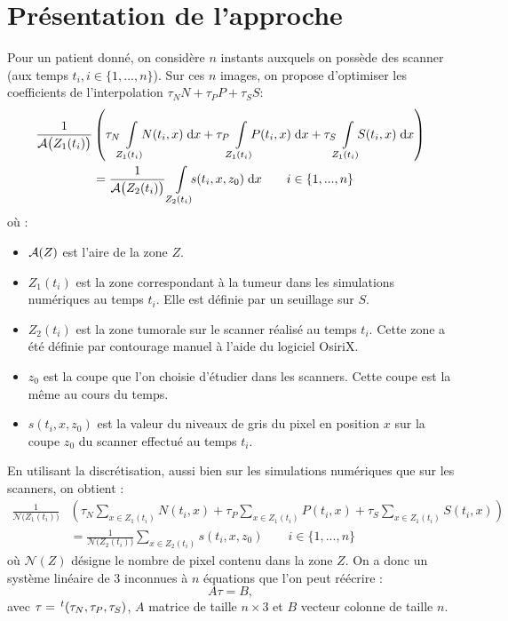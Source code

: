\documentclass[main.tex]{subfiles}
\begin{document}
\section{Présentation de l'approche}
Pour un patient donné, on considère $n$ instants auxquels on possède des scanner (aux temps $t_i, i\in \{ 1,...,n \}$). Sur ces $n$ images, on propose d'optimiser les coefficients de l'interpolation $\tau_N N + \tau_P P + \tau_S S$:
\begin{equation}
\begin{aligned}
\frac{1}{\aire\big(Z_1(t_i)\big)}&\left( \tau_N\intperso{Z_1(t_i)}N(t_i,x) \dx + \tau_P\intperso{Z_1(t_i)}P(t_i,x) \dx + \tau_S\intperso{Z_1(t_i)} S(t_i,x) \dx \right) \\
&= \frac{1}{\aire\big(Z_2(t_i)\big)} \ \intperso{Z_2(t_i)} s(t_i,x,z_0) \dx \qquad i \in \{1,...,n\}
\end{aligned}
\end{equation}
où : \begin{itemize}
\item $\mathcal{A}(Z)$ est l'aire de la zone $Z$.
\item $Z_1(t_i)$ est la zone correspondant à la tumeur dans les simulations numériques au temps $t_i$. Elle est définie par un seuillage sur $S$.
\item $Z_2(t_i)$ est la zone tumorale sur le scanner réalisé au temps $t_i$. Cette zone a été définie par contourage manuel à l'aide du logiciel OsiriX.
\item $z_0$ est la coupe que l'on choisie d'étudier dans les scanners. Cette coupe est la même au cours du temps.
\item $s(t_i,x,z_0)$ est la valeur du niveaux de gris du pixel en position $x$ sur la coupe $z_0$ du scanner effectué au temps $t_i$.
\end{itemize}
En utilisant la discrétisation, aussi bien sur les simulations numériques que sur les scanners, on obtient :
\begin{equation}
\begin{aligned}
\frac{1}{\mathcal{N}\big(Z_1(t_i)\big)}&\left( \tau_N\!\!\sum_{x\in Z_1(t_i)}\!\!N(t_i,x) + \tau_P\!\!\sum_{x\in Z_1(t_i)}\!\!P(t_i,x) + \tau_S\!\!\sum_{x\in Z_1(t_i)}\!\!S(t_i,x) \right) \\
&= \frac{1}{\mathcal{N}\big(Z_2(t_i)\big)} \sum_{x\in Z_2(t_i)}\!\! s(t_i,x,z_0) \qquad i \in \{1,...,n\}
\end{aligned}
\end{equation}
où $\mathcal{N}(Z)$ désigne le nombre de pixel contenu dans la zone $Z$. On a donc un système linéaire de 3 inconnues à $n$ équations que l'on peut réécrire :
\begin{equation}
A\tau=B,
\end{equation}
avec $\tau= \,^t(\tau_N,\tau_P,\tau_S)$, $A$ matrice de taille $n\times 3$ et $B$ vecteur colonne de taille $n$.
\end{document}
